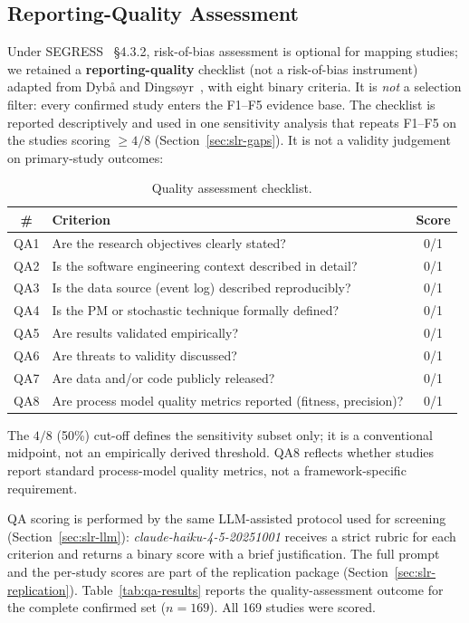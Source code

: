 \subsection{Reporting-Quality Assessment}
\label{sec:slr-qa}

Under SEGRESS~\cite{kitchenham2023segress} \S4.3.2, risk-of-bias assessment
is optional for mapping studies; we retained a \textbf{reporting-quality}
checklist (not a risk-of-bias instrument) adapted from
Dyb{\aa} and Dings{\o}yr~\cite{dyba2008}, with eight binary criteria. It is
\emph{not} a selection filter: every confirmed study enters the F1--F5
evidence base. The checklist is reported descriptively and used in one
sensitivity analysis that repeats F1--F5 on the studies scoring $\geq 4/8$
(Section~\ref{sec:slr-gaps}). It is not a validity judgement on primary-study
outcomes:

\begin{table}[htbp]
\centering
\caption{Quality assessment checklist.}
\label{tab:qa}
\begin{tabular}{clc}
\toprule
\textbf{\#} & \textbf{Criterion} & \textbf{Score} \\
\midrule
QA1 & Are the research objectives clearly stated?                    & 0/1 \\
QA2 & Is the software engineering context described in detail?       & 0/1 \\
QA3 & Is the data source (event log) described reproducibly?         & 0/1 \\
QA4 & Is the PM or stochastic technique formally defined?            & 0/1 \\
QA5 & Are results validated empirically?                             & 0/1 \\
QA6 & Are threats to validity discussed?                             & 0/1 \\
QA7 & Are data and/or code publicly released?                              & 0/1 \\
QA8 & Are process model quality metrics reported (fitness, precision)?& 0/1 \\
\bottomrule
\end{tabular}
\end{table}

The $4/8$ (50\%) cut-off defines the sensitivity subset only; it is a
conventional midpoint, not an empirically derived threshold. QA8 reflects
whether studies report standard process-model quality metrics, not a
framework-specific requirement.

QA scoring is performed by the same LLM-assisted protocol used for screening
(Section~\ref{sec:slr-llm}): \textit{claude-haiku-4-5-20251001} receives a
strict rubric for each criterion and returns a binary score with a brief
justification. The full prompt and the per-study scores are part of the
replication package (Section~\ref{sec:slr-replication}).
Table~\ref{tab:qa-results} reports the quality-assessment outcome for the
complete confirmed set ($n = 169$). All 169 studies were scored.


